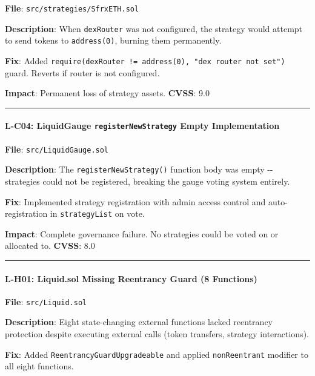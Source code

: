 \documentclass[
]{article}
\begin{document}
\textbf{File}: \texttt{src/strategies/SfrxETH.sol}

\textbf{Description}: When \texttt{dexRouter} was not configured, the
strategy would attempt to send tokens to \texttt{address(0)}, burning
them permanently.

\textbf{Fix}: Added
\texttt{require(dexRouter\ !=\ address(0),\ "dex\ router\ not\ set")}
guard. Reverts if router is not configured.

\textbf{Impact}: Permanent loss of strategy assets. \textbf{CVSS}: 9.0

\begin{center}\rule{0.5\linewidth}{0.5pt}\end{center}

\paragraph{\texorpdfstring{L-C04: LiquidGauge
\texttt{registerNewStrategy} Empty
Implementation}{L-C04: LiquidGauge registerNewStrategy Empty Implementation}}\label{l-c04-liquidgauge-registernewstrategy-empty-implementation}

\textbf{File}: \texttt{src/LiquidGauge.sol}

\textbf{Description}: The \texttt{registerNewStrategy()} function body
was empty -\/- strategies could not be registered, breaking the gauge
voting system entirely.

\textbf{Fix}: Implemented strategy registration with admin access
control and auto-registration in \texttt{strategyList} on vote.

\textbf{Impact}: Complete governance failure. No strategies could be
voted on or allocated to. \textbf{CVSS}: 8.0

\begin{center}\rule{0.5\linewidth}{0.5pt}\end{center}

\paragraph{L-H01: Liquid.sol Missing Reentrancy Guard (8
Functions)}\label{l-h01-liquidsol-missing-reentrancy-guard-8-functions}

\textbf{File}: \texttt{src/Liquid.sol}

\textbf{Description}: Eight state-changing external functions lacked
reentrancy protection despite executing external calls (token transfers,
strategy interactions).

\textbf{Fix}: Added \texttt{ReentrancyGuardUpgradeable} and applied
\texttt{nonReentrant} modifier to all eight functions.
\end{document}
